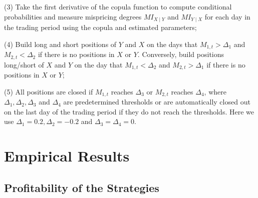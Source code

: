 \documentclass[a4paper]{article}
\begin{document}
	\vspace{0.3cm}
	\vspace{0.3cm}
	
	(3) Take the first derivative of the copula function to compute conditional
		probabilities and measure mispricing degrees $MI_{X\mid Y}$ and $MI_{Y\mid X}$ for each day in the trading period using the copula and estimated parameters;
		
	\vspace{0.3cm}
	\vspace{0.3cm}
		
	(4) Build long and short positions of $Y$ and $X$ on the days that $M_{1,t}>\Delta_{1}$ and $M_{2,t}<\Delta_{2}$ if there is no positions in $X$ or $Y$. Conversely, build positions long/short of $X$ and $Y$ on the day that $M_{1,t}<\Delta_{2}$ and $M_{2,t}>\Delta_{1}$ if there is no positions in $X$ or $Y$;
	
	\vspace{0.3cm}
	\vspace{0.3cm}
		
	(5) All positions are closed if $M_{1,t}$ reaches $\Delta_{3}$ or $M_{2,t}$ reaches $\Delta_{4}$, where $\Delta_{1},\Delta_{2},\Delta_{3}$ and $\Delta_{4}$ are predetermined thresholds or are automatically closed out on the last day of the trading period if they do not reach the thresholds. Here we use $\Delta_{1}=0.2, \Delta_{2}=-0.2$ and $\Delta_{3}=\Delta_{4}=0$.
	
	
	\vspace{0.6cm}
	
	\section{Empirical Results}
	
	\vspace{0.3cm}
	
	\subsection{Profitability of the Strategies}
	
\end{document}
